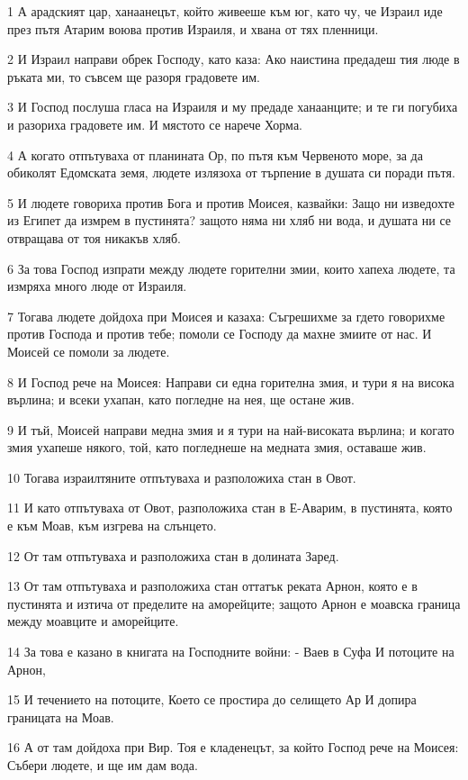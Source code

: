 \par 1 А арадският цар, ханаанецът, който живееше към юг, като чу, че Израил иде през пътя Атарим воюва против Израиля, и хвана от тях пленници.
\par 2 И Израил направи обрек Господу, като каза: Ако наистина предадеш тия люде в ръката ми, то съвсем ще разоря градовете им.
\par 3 И Господ послуша гласа на Израиля и му предаде ханаанците; и те ги погубиха и разориха градовете им. И мястото се нарече Хорма.
\par 4 А когато отпътуваха от планината Ор, по пътя към Червеното море, за да обиколят Едомската земя, людете излязоха от търпение в душата си поради пътя.
\par 5 И людете говориха против Бога и против Моисея, казвайки: Защо ни изведохте из Египет да измрем в пустинята? защото няма ни хляб ни вода, и душата ни се отвращава от тоя никакъв хляб.
\par 6 За това Господ изпрати между людете горителни змии, които хапеха людете, та измряха много люде от Израиля.
\par 7 Тогава людете дойдоха при Моисея и казаха: Съгрешихме за гдето говорихме против Господа и против тебе; помоли се Господу да махне змиите от нас. И Моисей се помоли за людете.
\par 8 И Господ рече на Моисея: Направи си една горителна змия, и тури я на висока върлина; и всеки ухапан, като погледне на нея, ще остане жив.
\par 9 И тъй, Моисей направи медна змия и я тури на най-високата върлина; и когато змия ухапеше някого, той, като погледнеше на медната змия, оставаше жив.
\par 10 Тогава израилтяните отпътуваха и разположиха стан в Овот.
\par 11 И като отпътуваха от Овот, разположиха стан в Е-Аварим, в пустинята, която е към Моав, към изгрева на слънцето.
\par 12 От там отпътуваха и разположиха стан в долината Заред.
\par 13 От там отпътуваха и разположиха стан оттатък реката Арнон, която е в пустинята и изтича от пределите на аморейците; защото Арнон е моавска граница между моавците и аморейците.
\par 14 За това е казано в книгата на Господните войни: - Ваев в Суфа И потоците на Арнон,
\par 15 И течението на потоците, Което се простира до селището Ар И допира границата на Моав.
\par 16 А от там дойдоха при Вир. Тоя е кладенецът, за който Господ рече на Моисея: Събери людете, и ще им дам вода.
